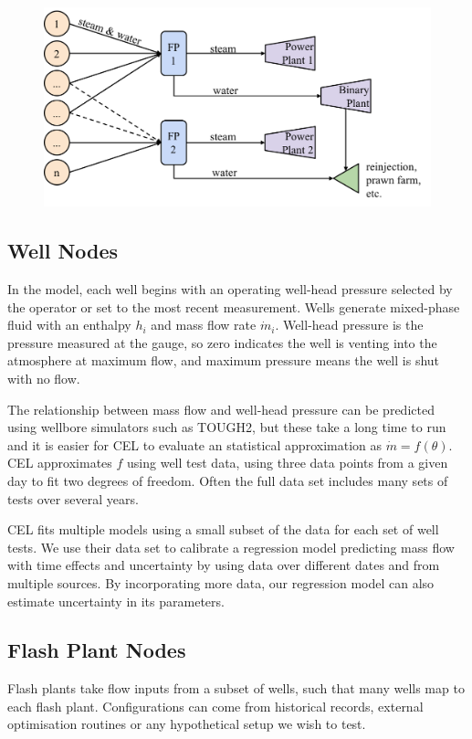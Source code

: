\documentclass[a4paper, 12pt]{article}
\begin{document}
\begin{figure}
  \centering
  \includegraphics[width=0.5\linewidth]{media/network_diagram}
  \label{fig:network_diagram}
\end{figure}

\subsection{Well Nodes}
In the model, each well begins with an operating well-head pressure selected by the operator or set to the most recent measurement. Wells generate mixed-phase fluid with an enthalpy $h_i$ and mass flow rate $\dot{m}_i$. Well-head pressure is the pressure measured at the gauge, so zero indicates the well is venting into the atmosphere at maximum flow, and maximum pressure means the well is shut with no flow.

The relationship between mass flow and well-head pressure can be predicted using wellbore simulators such as TOUGH2, but these take a long time to run and it is easier for CEL to evaluate an statistical approximation as $\dot{m} = f(\theta)$. CEL approximates $f$ using well test data, using three data points from a given day to fit two degrees of freedom. Often the full data set includes many sets of tests over several years.

CEL fits multiple models using a small subset of the data for each set of well tests. We use their data set to calibrate a regression model predicting mass flow with time effects and uncertainty by using data over different dates and from multiple sources. By incorporating more data, our regression model can also estimate uncertainty in its parameters.

\subsection{Flash Plant Nodes}
Flash plants take flow inputs from a subset of wells, such that many wells map to each flash plant. Configurations can come from historical records, external optimisation routines or any hypothetical setup we wish to test.
\end{document}

